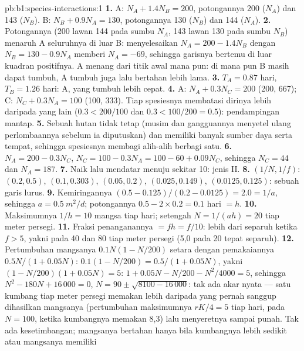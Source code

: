 \begin{solution}{pb:b1:species-interactions:1}
\textbf{1.} A: $N_A + 1.4 N_B = 200$, potongannya 200 ($N_A$) dan 143
($N_B$). B: $N_B + 0.9 N_A = 130$, potongannya 130 ($N_B$) dan 144
($N_A$).
\textbf{2.} Potongannya (200 lawan 144 pada sumbu $N_A$, 143 lawan
130 pada sumbu $N_B$) menaruh  A seluruhnya di luar  B:
menyelesaikan $N_A = 200 - 1.4 N_B$ dengan $N_B = 130 - 0.9 N_A$ memberi $N_A = -69$,
sehingga garisnya bertemu di luar kuadran positifnya. A menang dari
titik awal mana pun: di mana pun B masih dapat tumbuh, A tumbuh juga
lalu bertahan lebih lama.
\textbf{3.} $T_A = 0.87$ hari, $T_B = 1.26$ hari: A, yang tumbuh lebih
cepat.
\textbf{4.} A: $N_A + 0.3 N_C = 200$ (200, 667); C: $N_C + 0.3 N_A =
100$ (100, 333). Tiap spesiesnya membatasi dirinya lebih daripada yang
lain ($0.3 < 200/100$ dan $0.3 < 100/200 = 0.5$): pendampingan mantap.
\textbf{5.} Sebuah hutan tidak tetap (musim dan gangguannya menyetel
ulang perlombaannya sebelum ia diputuskan) dan memiliki banyak sumber
daya serta tempat, sehingga spesiesnya membagi  alih-alih
berbagi satu.
\textbf{6.} $N_A = 200 - 0.3 N_C$, $N_C = 100 - 0.3 N_A = 100 - 60 +
0.09 N_C$, sehingga $N_C = 44$ dan $N_A = 187$.
\textbf{7.} Naik lalu mendatar menuju sekitar 10: jenis II.
\textbf{8.} $(1/N, 1/f)$: $(0.2, 0.5)$, $(0.1, 0.303)$, $(0.05, 0.2)$,
$(0.025, 0.149)$, $(0.0125, 0.125)$: sebuah garis lurus.
\textbf{9.} Kemiringannya $(0.5 - 0.125)/(0.2 - 0.0125) = 2.0 = 1/a$, sehingga $a =
\qty{0.5}{m^2/d}$; potongannya $0.5 - 2\times 0.2 = 0.1$ hari $= h$.
\textbf{10.} Maksimumnya $1/h = 10$ mangsa tiap hari; setengah  $N =
1/(ah) = 20$ tiap meter persegi.
\textbf{11.} Fraksi penanganannya $= f h = f/10$: lebih dari separuh ketika $f
> 5$, yakni pada 40 dan 80 tiap meter persegi (5,0 pada 20 tepat separuh).
\textbf{12.} Pertumbuhan mangsanya $0.1 N (1 - N/200)$ setara dengan
pemakaiannya $0.5N/(1 + 0.05N)$: $0.1(1 - N/200) = 0.5/(1 + 0.05 N)$, yakni
$(1 - N/200)(1 + 0.05N) = 5$: $1 + 0.05N - N/200 - N^2/4000 = 5$, sehingga
$N^2 - 180 N + 16\,000 = 0$, $N = 90 \pm \sqrt{8100 - 16\,000}$: tak ada
akar nyata --- satu kumbang tiap meter persegi memakan lebih daripada
yang pernah sanggup dihasilkan mangsanya (pertumbuhan maksimumnya $rK/4 = 5$
tiap hari, pada $N = 100$, ketika kumbangnya memakan 8,3) lalu
menyeretnya sampai punah. Tak ada kesetimbangan; mangsanya bertahan
hanya bila kumbangnya lebih sedikit atau mangsanya memiliki

\end{solution}
